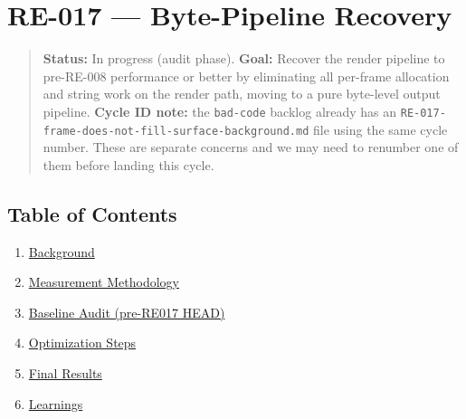 \chapter{RE-017 --- Byte-Pipeline Recovery}\label{record-422}

\smallskip

\begin{quote}
\textbf{Status:} In progress (audit phase). \textbf{Goal:} Recover the render pipeline to pre-RE-008 performance or better by eliminating all per-frame allocation and string work on the render path, moving to a pure byte-level output pipeline. \textbf{Cycle ID note:} the \texttt{b\allowbreak{}a\allowbreak{}d\allowbreak{}-\allowbreak{}c\allowbreak{}o\allowbreak{}d\allowbreak{}e} backlog already has an \texttt{R\allowbreak{}E\allowbreak{}-\allowbreak{}0\allowbreak{}1\allowbreak{}7\allowbreak{}-\allowbreak{}f\allowbreak{}r\allowbreak{}a\allowbreak{}m\allowbreak{}e\allowbreak{}-\allowbreak{}d\allowbreak{}o\allowbreak{}e\allowbreak{}s\allowbreak{}-\allowbreak{}n\allowbreak{}o\allowbreak{}t\allowbreak{}-\allowbreak{}f\allowbreak{}i\allowbreak{}l\allowbreak{}l\allowbreak{}-\allowbreak{}s\allowbreak{}u\allowbreak{}r\allowbreak{}f\allowbreak{}a\allowbreak{}c\allowbreak{}e\allowbreak{}-\allowbreak{}b\allowbreak{}a\allowbreak{}c\allowbreak{}k\allowbreak{}g\allowbreak{}r\allowbreak{}o\allowbreak{}u\allowbreak{}n\allowbreak{}d\allowbreak{}.\allowbreak{}m\allowbreak{}d} file using the same cycle number. These are separate concerns and we may need to renumber one of them before landing this cycle.
\end{quote}

\section{Table of Contents}\label{record-422-table-of-contents}

\begin{enumerate}
\def\labelenumi{\arabic{enumi}.}
\tightlist
\item
  \hyperref[record-422-background]{Background}
\item
  \hyperref[record-422-measurement-methodology]{Measurement Methodology}
\item
  \hyperref[record-422-baseline-audit-pre-re017-head]{Baseline Audit (pre-RE017 HEAD)}
\item
  \hyperref[record-422-optimization-steps]{Optimization Steps}
\item
  \hyperref[record-422-final-results]{Final Results}
\item
  \hyperref[record-422-learnings]{Learnings}
\end{enumerate}

